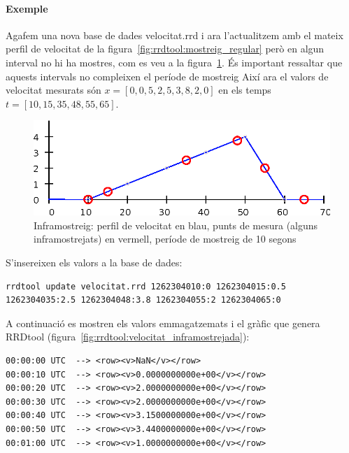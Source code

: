 \paragraph{Exemple}

Agafem una nova base de dades velocitat.rrd i ara l'actualitzem amb el mateix perfil de velocitat de la figura~\ref{fig:rrdtool:mostreig_regular} però en algun interval no hi ha mostres, com es veu a la figura~\ref{fig:rrdtool:inframostreig}. És important ressaltar que aquests intervals no compleixen el període de mostreig
 Així ara el valors de velocitat mesurats són $x=[0, 0{,}5 , 2{,}5 , 3{,}8 , 2 , 0]$ en els temps $t=[10, 15, 35, 48, 55, 65]$.

\begin{figure}[htp]
  \centering
  \includegraphics[width=\textwidth]{imatges/rrdtool/inframostreig.eps}
  \caption{Inframostreig: perfil de velocitat en blau, punts de mesura (alguns inframostrejats) en vermell, període de mostreig de 10 segons}
  \label{fig:rrdtool:inframostreig}
\end{figure}



S'insereixen els valors a la base de dades:
\begin{lstlisting}[style=sh]
rrdtool update velocitat.rrd 1262304010:0 1262304015:0.5 1262304035:2.5 1262304048:3.8 1262304055:2 1262304065:0
\end{lstlisting}

A continuació es mostren els valors emmagatzemats i el gràfic que genera RRDtool (figura~\ref{fig:rrdtool:velocitat_inframostrejada}):
\begin{lstlisting}
00:00:00 UTC  --> <row><v>NaN</v></row>
00:00:10 UTC  --> <row><v>0.0000000000e+00</v></row>
00:00:20 UTC  --> <row><v>2.0000000000e+00</v></row>
00:00:30 UTC  --> <row><v>2.0000000000e+00</v></row>
00:00:40 UTC  --> <row><v>3.1500000000e+00</v></row>
00:00:50 UTC  --> <row><v>3.4400000000e+00</v></row>
00:01:00 UTC  --> <row><v>1.0000000000e+00</v></row>
\end{lstlisting}


